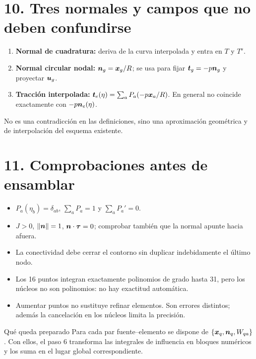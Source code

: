 \documentclass[11pt]{article}
\begin{document}
\section*{10. Tres normales y campos que no deben confundirse}
\begin{enumerate}
 \item \textbf{Normal de cuadratura:} deriva de la curva interpolada y entra
 en \(T\) y \(T^s\).
 \item \textbf{Normal circular nodal:} \(\bm{n}_g=\bm{x}_g/R\);
 se usa para fijar \(\bm{t}_g=-p\bm{n}_g\) y proyectar \(\bm{u}_g\).
 \item \textbf{Tracción interpolada:}
 \(\bm{t}_e(\eta)=\sum_aP_a(-p\bm{x}_a/R)\).
 En general no coincide exactamente con \(-p\bm{n}_e(\eta)\).
\end{enumerate}
No es una contradicción en las definiciones, sino una aproximación
geométrica y de interpolación del esquema existente.

\section*{11. Comprobaciones antes de ensamblar}
\begin{itemize}
 \item \(P_a(\eta_b)=\delta_{ab}\), \(\sum_aP_a=1\) y \(\sum_aP_a'=0\).
 \item \(J>0\), \(\left\lVert\bm{n}\right\rVert=1\), \(\bm{n}\cdot\bm{\tau}=0\);
 comprobar también que la normal apunte hacia afuera.
 \item La conectividad debe cerrar el contorno sin duplicar indebidamente
 el último nodo.
 \item Los 16 puntos integran exactamente polinomios de grado hasta 31,
 pero los núcleos no son polinomios: no hay exactitud automática.
 \item Aumentar puntos no sustituye refinar elementos. Son errores
 distintos; además la cancelación en los núcleos limita la precisión.
\end{itemize}
\begin{resultado}{Qué queda preparado}
Para cada par fuente--elemento se dispone de
\(\{\bm{x}_q,\bm{n}_q,W_{qa}\}\).
Con ellos, el paso 6 transforma las integrales de influencia en bloques
numéricos y los suma en el lugar global correspondiente.
\end{resultado}
\fuentes
\end{document}
